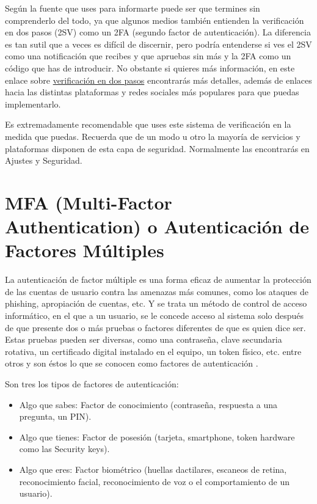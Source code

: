 \documentclass[
  spanish,
  a4paper,
  openany]{book}
\providecommand{\tightlist}{%
  \setlength{\itemsep}{0pt}\setlength{\parskip}{0pt}}
\begin{document}
Según la fuente que uses para informarte puede ser que termines sin comprenderlo del todo, ya que algunos medios también entienden la verificación en dos pasos (2SV) como un 2FA (segundo factor de autenticación). La diferencia es tan sutil que a veces es difícil de discernir, pero podría entenderse si ves el 2SV como una notificación que recibes y que apruebas sin más y la 2FA como un código que has de introducir. No obstante si quieres más información, en este enlace sobre \href{https://www.osi.es/es/actualidad/blog/2017/01/17/verificacion-en-dos-pasos-que-es-y-como-me-puede-ayudar}{verificación en dos pasos} encontrarás más detalles, además de enlaces hacia las distintas plataformas y redes sociales más populares para que puedas implementarlo.

Es extremadamente recomendable que uses este sistema de verificación en la medida que puedas. Recuerda que de un modo u otro la mayoría de servicios y plataformas disponen de esta capa de seguridad. Normalmente las encontrarás en Ajustes y Seguridad.

\hypertarget{mfa-multi-factor-authentication-o-autenticaciuxf3n-de-factores-muxfaltiples}{%
\section{MFA (Multi-Factor Authentication) o Autenticación de Factores Múltiples}\label{mfa-multi-factor-authentication-o-autenticaciuxf3n-de-factores-muxfaltiples}}

La autenticación de factor múltiple es una forma eficaz de aumentar la protección de las cuentas de usuario contra las amenazas más comunes, como los ataques de phishing, apropiación de cuentas, etc. Y se trata un método de control de acceso informático, en el que a un usuario, se le concede acceso al sistema solo después de que presente dos o más pruebas o factores diferentes de que es quien dice ser. Estas pruebas pueden ser diversas, como una contraseña, clave secundaria rotativa, un certificado digital instalado en el equipo, un token físico, etc. entre otros y son éstos lo que se conocen como factores de autenticación \citep{WIKI-multiple-factor}.

Son tres los tipos de factores de autenticación:

\begin{itemize}
\tightlist
\item
  Algo que sabes: Factor de conocimiento (contraseña, respuesta a una pregunta, un PIN).
\item
  Algo que tienes: Factor de posesión (tarjeta, smartphone, token hardware como las Security keys).
\item
  Algo que eres: Factor biométrico (huellas dactilares, escaneos de retina, reconocimiento facial, reconocimiento de voz o el comportamiento de un usuario).
\end{itemize}
\end{document}
